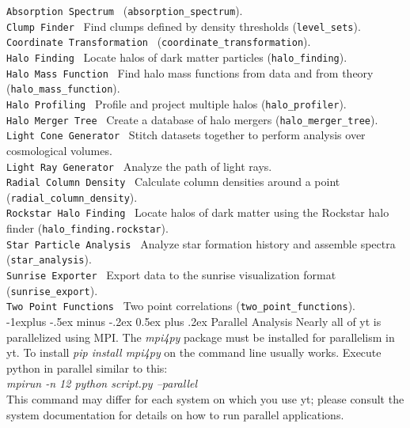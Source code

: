 \documentclass[10pt,landscape]{article}
\makeatletter
\renewcommand{\subsection}{\@startsection{subsection}{2}{0mm}%
                                {-1explus -.5ex minus -.2ex}%
                                {0.5ex plus .2ex}%
                                {\normalfont\normalsize\bfseries}}
\makeatother
\begin{document}
\begin{multicols}{3}
\texttt{Absorption Spectrum} \textemdash\ (\texttt{absorption\_spectrum}). \\
\texttt{Clump Finder} \textemdash\ Find clumps defined by density thresholds (\texttt{level\_sets}). \\
\texttt{Coordinate Transformation} \textemdash\ (\texttt{coordinate\_transformation}). \\
\texttt{Halo Finding} \textemdash\ Locate halos of dark matter particles (\texttt{halo\_finding}). \\
\texttt{Halo Mass Function} \textemdash\ Find halo mass functions from data and from theory (\texttt{halo\_mass\_function}). \\
\texttt{Halo Profiling} \textemdash\ Profile and project multiple halos (\texttt{halo\_profiler}). \\
\texttt{Halo Merger Tree} \textemdash\ Create a database of halo mergers (\texttt{halo\_merger\_tree}). \\
\texttt{Light Cone Generator} \textemdash\ Stitch datasets together to perform analysis over cosmological volumes. \\
\texttt{Light Ray Generator} \textemdash\ Analyze the path of light rays.\\
\texttt{Radial Column Density} \textemdash\ Calculate column densities around a point (\texttt{radial\_column\_density}). \\
\texttt{Rockstar Halo Finding} \textemdash\ Locate halos of dark matter using the Rockstar halo finder (\texttt{halo\_finding.rockstar}). \\
\texttt{Star Particle Analysis} \textemdash\ Analyze star formation history and assemble spectra (\texttt{star\_analysis}). \\
\texttt{Sunrise Exporter} \textemdash\ Export data to the sunrise visualization format (\texttt{sunrise\_export}). \\
\texttt{Two Point Functions} \textemdash\ Two point correlations (\texttt{two\_point\_functions}). \\


\subsection{Parallel Analysis}
Nearly all of yt is parallelized using MPI.
The {\it mpi4py} package must be installed for parallelism in yt.
To install {\it pip install mpi4py} on the command line usually works.
Execute python in parallel similar to this:\\
{\it mpirun -n 12 python script.py --parallel}\\
This command may differ for each system on which you use yt;
please consult the system documentation for details on how to run parallel applications.


\end{multicols}
\end{document}
